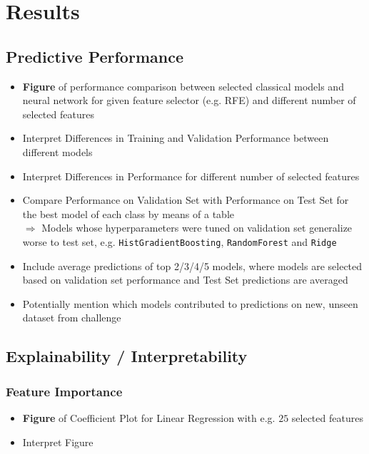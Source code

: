 \documentclass[12pt, letterpaper]{article}
\begin{document}
\section{Results}

\subsection{Predictive Performance}
\begin{itemize}
    \item \textbf{Figure} of performance comparison between selected classical models and neural network for given feature selector (e.g. RFE) and different number of selected features
    \item Interpret Differences in Training and Validation Performance between different models
    \item Interpret Differences in Performance for different number of selected features
    \item Compare Performance on Validation Set with Performance on Test Set for the best model of each class by means of a table \\
          $\Rightarrow$ Models whose hyperparameters were tuned on validation set generalize worse to test set, e.g. \texttt{HistGradientBoosting}, \texttt{RandomForest} and \texttt{Ridge}
    \item Include average predictions of top 2/3/4/5 models, where models are selected based on validation set performance and Test Set predictions are averaged
    \item Potentially mention which models contributed to predictions on new, unseen dataset from challenge
\end{itemize}

\subsection{Explainability / Interpretability}

\subsubsection{Feature Importance}
\begin{itemize}
    \item \textbf{Figure} of Coefficient Plot for Linear Regression with e.g. $25$ selected features
    \item Interpret Figure
\end{itemize}
\end{document}

